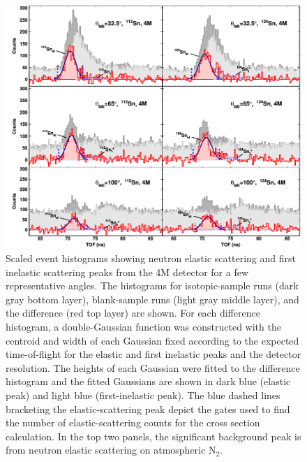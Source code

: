 \begin{figure}[ht]
    \centering
    \includegraphics[width = 1.0\textwidth]{figures/tiledAngleData.png}
    \caption[Scaled event histograms showing neutron elastic scattering peak]
    {
        Scaled event histograms showing neutron elastic scattering and first
        inelastic scattering peaks from the 4M detector for a few representative angles. The
        histograms for isotopic-sample runs (dark gray bottom layer),
        blank-sample runs (light gray middle layer), and the difference (red
        top layer) are shown.
        For each difference histogram, a double-Gaussian function
        was constructed with the centroid and width of each Gaussian fixed
        according to the expected time-of-flight for the elastic and first
        inelastic peaks and the detector resolution. The heights of each
        Gaussian were fitted to the difference histogram and the fitted
        Gaussians are shown in dark blue (elastic peak) and light blue
        (first-inelastic peak). The blue dashed lines bracketing the
        elastic-scattering peak depict the gates used to find the number of
        elastic-scattering counts for the cross section calculation.
        In the top two panels, the significant background peak 
        is from neutron elastic scattering on atmospheric N$_{2}$.
    }
    \label{tiledAngleData}
\end{figure}

